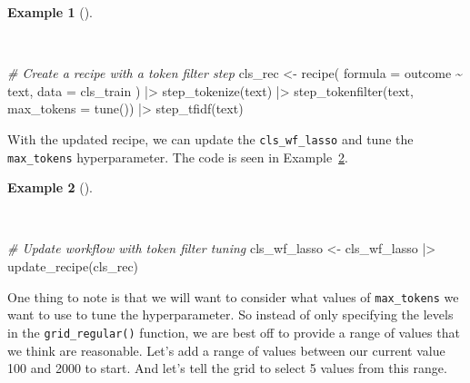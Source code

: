 \documentclass[
  letterpaper,
]{latex/krantz}
\newenvironment{Shaded}{\begin{snugshade}}{\end{snugshade}}
\newcommand{\AttributeTok}[1]{\textcolor[rgb]{0.00,0.00,0.00}{#1}}
\newcommand{\CommentTok}[1]{\textcolor[rgb]{0.00,0.00,0.00}{\textit{#1}}}
\newcommand{\FunctionTok}[1]{\textcolor[rgb]{0.00,0.00,0.00}{#1}}
\newcommand{\NormalTok}[1]{\textcolor[rgb]{0.00,0.00,0.00}{#1}}
\newcommand{\OtherTok}[1]{\textcolor[rgb]{0.00,0.00,0.00}{#1}}
\newcommand{\SpecialCharTok}[1]{\textcolor[rgb]{0.00,0.00,0.00}{#1}}
\theoremstyle{definition}
\newtheorem{example}{Example}[chapter]
\theoremstyle{remark}
\begin{document}
\begin{example}[]\protect\hypertarget{exm-pda-class-tune-hyperparameters-tokenfilter}{}\label{exm-pda-class-tune-hyperparameters-tokenfilter}

~

\begin{Shaded}
\begin{Highlighting}[]
\CommentTok{\# Create a recipe with a token filter step}
\NormalTok{cls\_rec }\OtherTok{\textless{}{-}}
  \FunctionTok{recipe}\NormalTok{(}
    \AttributeTok{formula =}\NormalTok{ outcome }\SpecialCharTok{\textasciitilde{}}\NormalTok{ text,}
    \AttributeTok{data =}\NormalTok{ cls\_train}
\NormalTok{    ) }\SpecialCharTok{|\textgreater{}}
  \FunctionTok{step\_tokenize}\NormalTok{(text) }\SpecialCharTok{|\textgreater{}}
  \FunctionTok{step\_tokenfilter}\NormalTok{(text, }\AttributeTok{max\_tokens =} \FunctionTok{tune}\NormalTok{()) }\SpecialCharTok{|\textgreater{}}
  \FunctionTok{step\_tfidf}\NormalTok{(text)}
\end{Highlighting}
\end{Shaded}

\end{example}

With the updated recipe, we can update the \texttt{cls\_wf\_lasso} and
tune the \texttt{max\_tokens} hyperparameter. The code is seen in
Example~\ref{exm-pda-class-tune-hyperparameters-update-rec}.

\begin{example}[]\protect\hypertarget{exm-pda-class-tune-hyperparameters-update-rec}{}\label{exm-pda-class-tune-hyperparameters-update-rec}

~

\begin{Shaded}
\begin{Highlighting}[]
\CommentTok{\# Update workflow with token filter tuning}
\NormalTok{cls\_wf\_lasso }\OtherTok{\textless{}{-}}
\NormalTok{  cls\_wf\_lasso }\SpecialCharTok{|\textgreater{}}
  \FunctionTok{update\_recipe}\NormalTok{(cls\_rec)}
\end{Highlighting}
\end{Shaded}

\end{example}

One thing to note is that we will want to consider what values of
\texttt{max\_tokens} we want to use to tune the hyperparameter. So
instead of only specifying the levels in the \texttt{grid\_regular()}
function, we are best off to provide a range of values that we think are
reasonable. Let's add a range of values between our current value 100
and 2000 to start. And let's tell the grid to select 5 values from this
range.
\end{document}
